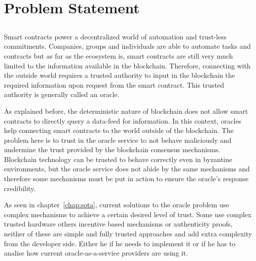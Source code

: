 \chapter{Problem Statement}\label{chap:chap4}

\section*{}


Smart contracts power a decentralized world of automation and trust-less commitments. Companies, groups and individuals are able to automate tasks and contracts but as far as the ecosystem is, smart contracts are still very much limited to the information available in the blockchain. Therefore, connecting with the outside world requires a trusted authority to input in the blockchain the required information upon request from the smart contract. This trusted authority is generally called an oracle.

As explained before, the deterministic nature of blockchain does not allow smart contracts to directly query a data-feed for information. In this context, oracles help connecting smart contracts to the world outside of the blockchain. The problem here is to trust in the oracle service to not behave maliciously and undermine the trust provided by the blockchain consensus mechanisms. Blockchain technology can be trusted to behave correctly even in byzantine environments, but the oracle service does not abide by the same mechanisms and therefore some mechanisms must be put in action to ensure the oracle's response credibility.

As seen in chapter~\ref{chap:sota}, current solutions to the oracle problem use complex mechanisms to achieve a certain desired level of trust. Some use complex trusted hardware others incentive based mechanisms or authenticity proofs, neither of these are simple and fully trusted approaches and add extra complexity from the developer side. Either he if he needs to implement it or if he has to analise how current oracle-as-a-service providers are using it.

